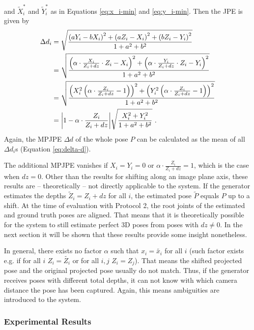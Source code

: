 and $\widetilde{X}_i^\ast$ and $\widetilde{Y}_i^\ast$ as in Equations \eqref{eq:x_i-min} and \eqref{eq:y_i-min}.
Then the JPE  is given by 
\begin{align}
	\label{eq:z-shift-error}
	\Delta d_i &= \sqrt{\frac{\left (a Y_i - b X_i \right )^2 + \left (a Z_i - X_i \right )^2 + \left (b Z_i - Y_i \right )^2}{1 + a^2 + b^2}} \\ 
	&= \sqrt{\frac{\left (\alpha \cdot \frac{X_i}{Z_i + dz}\cdot Z_i - X_i \right )^2 + \left (\alpha \cdot \frac{Y_i }{Z_i + dz}\cdot Z_i- Y_i \right )^2}{1 + a^2 + b^2}} \\
	&= \sqrt{\frac{\left (X_i^2 \left (\alpha \cdot \frac{Z_i}{Z_i + dz} - 1 \right) \right )^2 + \left (Y_i^2 \left (\alpha \cdot \frac{Z_i}{Z_i + dz}-1 \right ) \right )^2}{1 + a^2 + b^2}} \\
	&= \abs{1 - \alpha \cdot \frac{Z_i}{Z_i + dz}}  \sqrt{\frac{X_i^2 + Y_i^2}{1 + a^2 + b^2}}\ .
\end{align}
Again, the MPJPE $\Delta d$ of the whole pose $P$ can be calculated as the mean of all $\Delta d_i$s (Equation \eqref{eq:delta-d}).

The additional MPJPE vanishes if $X_i = Y_i = 0$ or $\alpha \cdot \frac{Z_i}{Z_i + dz} = 1$, which is the case when $dz = 0$.
Other than the results for shifting along an image plane axis, these results are -- theoretically -- not directly applicable to the system.
If the generator estimates the depths $\widetilde{Z}_i = Z_i + dz$ for all $i$, the estimated pose $\widetilde{P}$ equals $P$ up to a shift.
At the time of evaluation with Protocol 2, the root joints of the estimated and ground truth poses are aligned.
That means that it is theoretically possible for the system to still estimate perfect 3D poses from poses with $dz \neq 0$.
In the next section it will be shown that these results provide some insight nonetheless.

In general, there exists no factor $\alpha$ such that $x_i = \widetilde{x_i}$ for all $i$ (such factor exists e.g. if for all $i$ $Z_i = \widetilde{Z_i}$ or for all $i, j$ $Z_i = Z_j$).
That means the shifted projected pose and the original projected pose usually do not match.
Thus, if the generator receives poses with different total depths, it can not know with which camera distance the pose has been captured.
Again, this means ambiguities are introduced to the system.


\subsubsection{Experimental Results}
\label{sec:error-on-shift-experimental}

